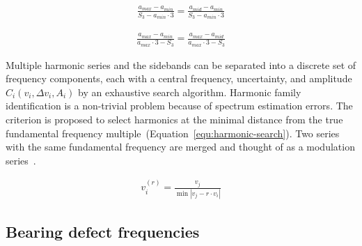 \begin{ceqn}\begin{align}
\frac{a_{max} - a_{min}}{S_3 - a_{min} \cdot 3} = \frac{a_{mid} - a_{min}}{S_3 - a_{min} \cdot 3}
\label{equ:mms-maxima}
\end{align}\end{ceqn}

\begin{ceqn}\begin{align}
\frac{a_{max} - a_{min}}{a_{max} \cdot 3 - S_3} = \frac{a_{max} - a_{mid}}{a_{max} \cdot 3 - S_3}
\label{equ:mms-minima}
 \end{align}\end{ceqn}

Multiple harmonic series and the sidebands can be separated into a discrete set of frequency components, each with a central frequency, uncertainty, and amplitude $C_i(v_i, \Delta v_i, A_i)$ by an exhaustive search algorithm. Harmonic family identification is a non-trivial problem because of spectrum estimation errors. The criterion is proposed to select harmonics at the minimal distance from the true fundamental frequency multiple~(Equation~\ref{equ:harmonic-search}). Two series with the same fundamental frequency are merged and thought of as a modulation series~\cite{gerber_identification_2013}.

\begin{ceqn}\begin{align}
v_i^{(r)} = \frac{v_j}{\min{|v_j - r \cdot v_i|}}
\label{equ:harmonic-search}
\end{align}\end{ceqn}

\subsection{Bearing defect frequencies}

